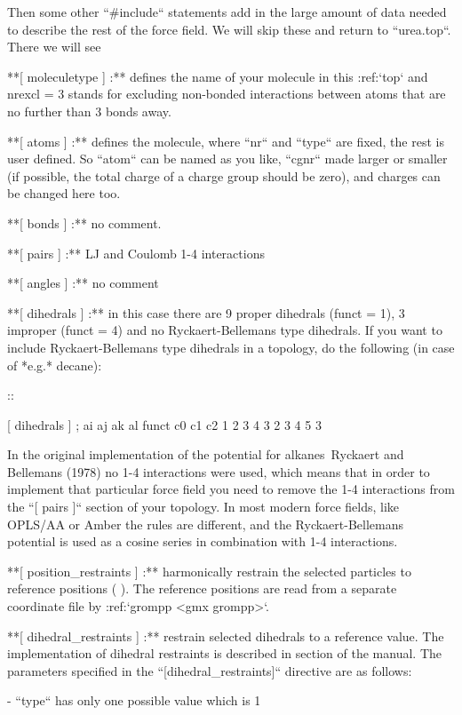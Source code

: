 Then some other ``#include`` statements add in the large
amount of data needed to describe the rest of the force field. We will
skip these and return to ``urea.top``. There we will see

**[ moleculetype ] :** defines the name of your molecule
in this :ref:`top` and nrexcl = 3 stands for excluding
non-bonded interactions between atoms that are no further than 3 bonds
away.

**[ atoms ] :** defines the molecule, where
``nr`` and ``type`` are fixed, the rest is user
defined. So ``atom`` can be named as you like,
``cgnr`` made larger or smaller (if possible, the total
charge of a charge group should be zero), and charges can be changed
here too.

**[ bonds ] :** no comment.

**[ pairs ] :** LJ and Coulomb 1-4 interactions

**[ angles ] :** no comment

**[ dihedrals ] :** in this case there are 9 proper
dihedrals (funct = 1), 3 improper (funct = 4) and no Ryckaert-Bellemans
type dihedrals. If you want to include Ryckaert-Bellemans type dihedrals
in a topology, do the following (in case of *e.g.* decane):

::

    [ dihedrals ]
    ;  ai    aj    ak    al funct       c0       c1       c2
        1    2     3     4     3 
        2    3     4     5     3

In the original implementation of the potential for alkanes Ryckaert and
Bellemans (1978) no 1-4 interactions were used, which means that in
order to implement that particular force field you need to remove the
1-4 interactions from the ``[ pairs ]`` section of your
topology. In most modern force fields, like OPLS/AA or Amber the rules
are different, and the Ryckaert-Bellemans potential is used as a cosine
series in combination with 1-4 interactions.

**[ position_restraints ] :** harmonically restrain the
selected particles to reference positions
(
). The reference positions
are read from a separate coordinate file by
:ref:`grompp <gmx grompp>`.

**[ dihedral_restraints ] :** restrain selected
dihedrals to a reference value. The implementation of dihedral
restraints is described in section
of the manual. The
parameters specified in the ``[dihedral_restraints]`` directive are as
follows:

-  ``type`` has only one possible value which is 1

